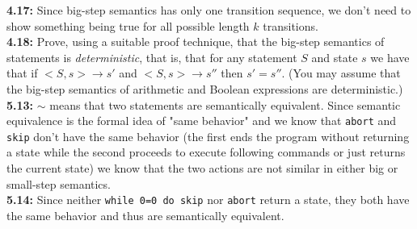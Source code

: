 \noindent\textbf{4.17: } Since big-step semantics has only one transition sequence, we don't need to show something being true for all possible length $k$ transitions. \\

\noindent\textbf{4.18: } Prove, using a suitable proof technique, that the big-step semantics of statements is \textit{deterministic}, that is, that for any statement $S$ and state $s$ we have that if $<S,s> \to s'$ and $<S,s> \to s''$ then $s' = s''$. (You may assume that the big-step semantics of arithmetic and Boolean expressions are deterministic.) \\

\noindent\textbf{5.13: } $\sim$ means that two statements are semantically equivalent. Since semantic equivalence is the formal idea of "same behavior" and we know that \texttt{abort} and \texttt{skip} don't have the same behavior (the first ends the program without returning a state while the second proceeds to execute following commands or just returns the current state) we know that the two actions are not similar in either big or small-step semantics. \\

\noindent\textbf{5.14: } Since neither \texttt{while 0=0 do skip} nor \texttt{abort} return a state, they both have the same behavior and thus are semantically equivalent.


